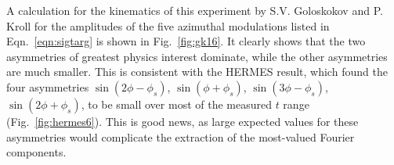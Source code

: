A calculation for the kinematics of this experiment by S.V. Goloskokov and
P. Kroll \cite{Go10,GoPC,Go11} for the amplitudes of the five azimuthal
modulations listed in Eqn.~\ref{eqn:sigtarg} is shown in Fig.~\ref{fig:gk16}.
It clearly shows that the two asymmetries of greatest physics interest
dominate, while the other asymmetries are much smaller.  This is consistent
with the HERMES result, which found the four asymmetries $\sin(2\phi-\phi_s)$, 
$\sin(\phi+\phi_s)$, $\sin(3\phi-\phi_s)$, $\sin(2\phi+\phi_s)$, to be small
over most of the measured $t$ range (Fig.~\ref{fig:hermes6}).  
This is good news, as large expected values for these asymmetries would
complicate the extraction of the most-valued Fourier components.
